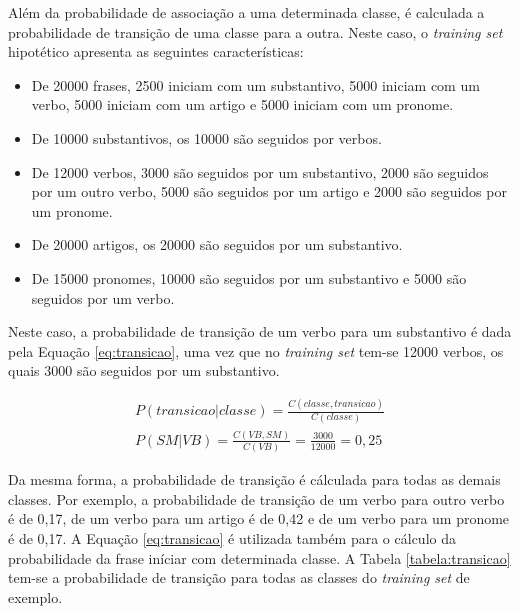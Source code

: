 Além da probabilidade de associação a uma determinada classe, é calculada a
probabilidade de transição de uma classe para a outra. Neste caso, o
\textit{training set} hipotético apresenta as seguintes características:

\begin{itemize}
  \item De 20000 frases, 2500 iniciam com um substantivo, 5000 iniciam com um
  verbo, 5000 iniciam com um artigo e 5000 iniciam com um pronome.
  \item De 10000 substantivos, os 10000
  são seguidos por verbos.
  \item De 12000 verbos, 3000 são seguidos por um substantivo, 2000
  são seguidos por um outro verbo, 5000 são seguidos por um artigo e 2000 são
  seguidos por um pronome.
  \item De 20000 artigos, os 20000 são seguidos por um substantivo.
  \item De 15000 pronomes, 10000 são seguidos por um substantivo e 5000 são
  seguidos por um verbo.
  
  
\end{itemize}

Neste caso, a probabilidade de transição de um verbo para um substantivo é dada
pela Equação \ref{eq:transicao}, uma vez que no \textit{training set} tem-se
12000 verbos, os quais 3000 são seguidos por um substantivo.

\begin{equation}
\begin{split}
P(transicao|classe) = \frac{C(classe,transicao)}{C(classe)} \\
P(SM|VB) = \frac{C(VB,SM)}{C(VB)} = \frac{3000}{12000} = 0,25
\end{split}
\label{eq:transicao}
\end{equation}

Da mesma forma, a probabilidade de transição é cálculada para todas as
demais classes. Por exemplo, a probabilidade de
transição de um verbo para outro verbo é de 0,17, de um verbo para um artigo é
de 0,42 e de um verbo para um pronome é de 0,17. A Equação
\ref{eq:transicao} é utilizada também para o cálculo da probabilidade da frase iníciar com
determinada classe.
A Tabela \ref{tabela:transicao} tem-se a probabilidade de transição para todas
as classes do \textit{training set} de exemplo.

